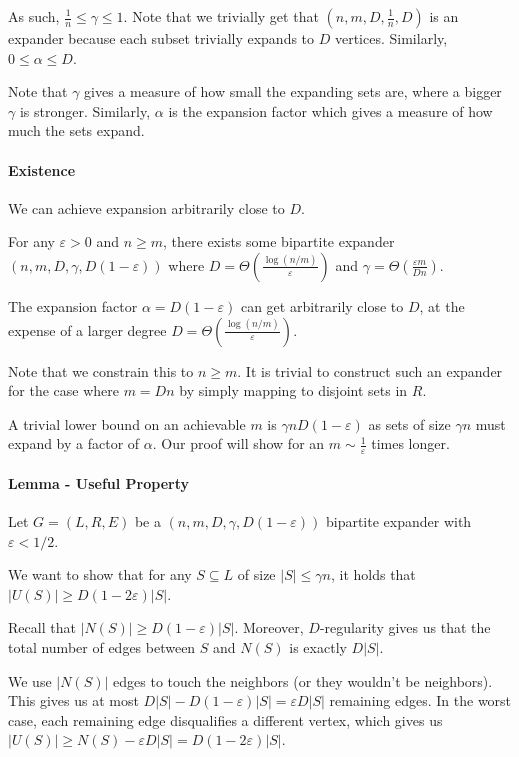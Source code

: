 \documentclass{idc_msc}
\begin{document}
As such, \(\frac{1}{n} \le \gamma \le 1\).
Note that we trivially get that \((n, m, D, \frac{1}{n}, D)\) is an expander because each subset trivially expands to \(D\) vertices.
Similarly, \(0 \le \alpha \le D\).

Note that \(\gamma\) gives a measure of how small the expanding sets are, where a bigger \(\gamma\) is stronger.
Similarly, \(\alpha\) is the expansion factor which gives a measure of how much the sets expand.

\paragraph{Existence}

We can achieve expansion arbitrarily close to \(D\).

For any \(\varepsilon > 0\) and \(n \ge m\), there exists some bipartite expander \((n, m, D, \gamma, D(1-\varepsilon))\) where \(D = \Theta\left(\frac{\log(n/m)}{\varepsilon}\right)\) and \(\gamma = \Theta\left(\frac{\varepsilon m}{D n}\right)\).

The expansion factor \(\alpha = D(1 - \varepsilon)\) can get arbitrarily close to \(D\), at the expense of a larger degree \(D = \Theta\left(\frac{\log(n/m)}{\varepsilon}\right)\).

Note that we constrain this to \(n \ge m\). It is trivial to construct such an expander for the case where \(m = Dn\) by simply mapping to disjoint sets in \(R\).

A trivial lower bound on an achievable \(m\) is \(\gamma n D (1 - \varepsilon)\) as sets of size \(\gamma n\) must expand by a factor of \(\alpha\). Our proof will show for an \(m \sim \frac{1}{\varepsilon}\) times longer.

\paragraph{Lemma - Useful Property}

Let \(G=(L, R, E)\) be a \((n,m,D,\gamma, D(1-\varepsilon))\) bipartite expander with \(\varepsilon < 1/2\).

We want to show that for any \(S \subseteq L\) of size \(|S| \le \gamma n\), it holds that \(|U(S)| \ge D (1 - 2 \varepsilon)|S|\).

Recall that \(|N(S)| \ge D(1-\varepsilon)|S|\).
Moreover, \(D\)-regularity gives us that the total number of edges between \(S\) and \(N(S)\) is exactly \(D|S|\).

We use \(|N(S)|\) edges to touch the neighbors (or they wouldn't be neighbors). This gives us at most \(D|S| - D(1-\varepsilon)|S|=\varepsilon D |S|\) remaining edges.
In the worst case, each remaining edge disqualifies a different vertex, which gives us \(|U(S)| \ge N(S) - \varepsilon D |S| = D (1-2\varepsilon)|S|\).
\end{document}
